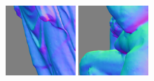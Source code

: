 \begin{subfigure}[t]{0.47\textwidth}
    \includegraphics[width=0.235\textwidth]{ch-psfcn/images/Dataset/complex/virgin-and-child_model_s-0.25_x--90_y-100_006_normal.png}
    \includegraphics[width=0.235\textwidth]{ch-psfcn/images/Dataset/complex/ugolino-and-his-sons_zz_decimated_s-0.07_x-080_y-100_002_normal.png}\\
    \end{subfigure}
